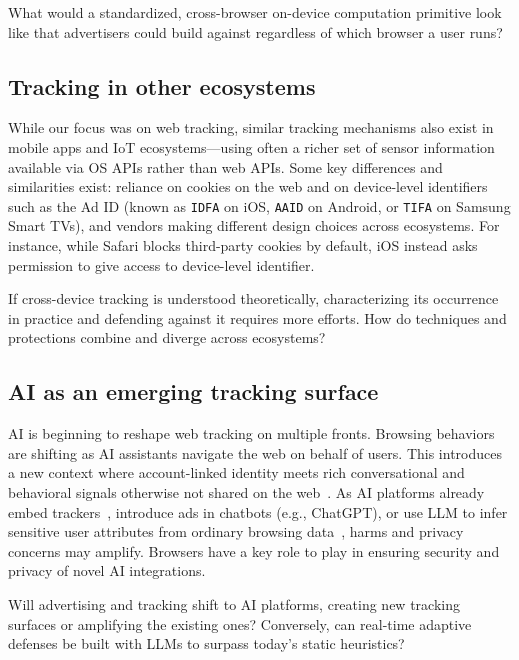 \begin{opbox}
What would a standardized, cross-browser on-device computation primitive look like that advertisers could build against regardless of which browser a user runs?
\end{opbox}


\subsection{Tracking in other ecosystems}

While our focus was on web tracking, similar tracking mechanisms also exist in mobile apps and IoT ecosystems---using often a richer set of sensor information available via OS APIs rather than web APIs. Some key differences and similarities exist: reliance on cookies on the web and on device-level identifiers such as the Ad ID (known as \texttt{IDFA} on iOS, \texttt{AAID} on Android, or \texttt{TIFA} on Samsung Smart TVs), and vendors making different design choices across ecosystems. For instance, while Safari blocks third-party cookies by default, iOS instead asks permission to give access to device-level identifier.

\begin{opbox}
If cross-device tracking is understood theoretically, characterizing its occurrence in practice and defending against it requires more efforts. How do techniques and protections combine and diverge across ecosystems?
\end{opbox}


\subsection{AI as an emerging tracking surface}

AI is beginning to reshape web tracking on multiple fronts.
%
Browsing behaviors are shifting as AI assistants navigate the web on behalf of users. This introduces a new context where account-linked identity meets rich conversational and behavioral signals otherwise not shared on the web~\cite{vekaria2025big}.
%
As AI platforms already embed trackers~\cite{jazlan2026tracking}, introduce ads in chatbots (e.g., ChatGPT), or use LLM to infer sensitive user attributes from ordinary browsing data~\cite{chenWhenAdsBecome2026}, harms and privacy concerns may amplify.
%
Browsers have a key role to play in ensuring security and privacy of novel AI integrations.

\begin{opbox}
Will advertising and tracking shift to AI platforms, creating new tracking surfaces or amplifying the existing ones? Conversely, can real-time adaptive defenses be built with LLMs to surpass today's static heuristics?
\end{opbox}